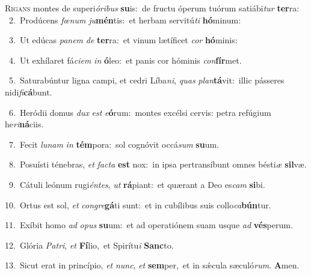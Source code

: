 \lettrine{\initial\textcolor{\initialcolor}{R}}{igans} montes de superi\-\textit{ó}\-\textit{ri}\textit{bus} \textbf{su}\-is:~\star de fructu óperum tuórum satiábi\textit{tur} \textbf{ter}\-ra:\\
{\numbfont\textcolor{\numbcolor}{~2.}}~Prodúcens \textit{fœ}\-\textit{num} \textit{ju}\-\textbf{mén}tis:~\star et herbam servitú\textit{ti} \textbf{hó}\-minum:\par
{\numbfont\textcolor{\numbcolor}{~3.}}~Ut edúcas \textit{pa}\-\textit{nem} \textit{de} \textbf{ter}\-ra:~\star et vinum lætíficet \textit{cor} \textbf{hó}\-minis:\par
{\numbfont\textcolor{\numbcolor}{~4.}}~Ut exhílaret fá\-\textit{ci}\-\textit{em} \textit{in} \textbf{ó}\-leo:~\star et panis cor hóminis \textit{con}\-\textbf{fír}met.\par
{\numbfont\textcolor{\numbcolor}{~5.}}~Saturabúntur ligna campi, et cedri Líba\-\textit{ni}\-, \textit{quas} \textit{plan}\-\textbf{tá}vit:~\star illic pásseres nidi\-\textit{fi}\-\textbf{cá}bunt.\par
{\numbfont\textcolor{\numbcolor}{~6.}}~Heródii domus \textit{dux} \textit{est} \textit{e}\-\textbf{ó}rum:~\star montes excélsi cervis: petra refúgium he\-\textit{ri}\-\textbf{ná}ciis.\par
{\numbfont\textcolor{\numbcolor}{~7.}}~Fecit \textit{lu}\-\textit{nam} \textit{in} \textbf{tém}\-pora:~\star sol cognóvit occá\textit{sum} \textbf{su}\-um.\par
{\numbfont\textcolor{\numbcolor}{~8.}}~Posuísti ténebras, \textit{et} \textit{fac}\-\textit{ta} \textbf{est} nox:~\star in ipsa pertransíbunt omnes bésti\textit{æ} \textbf{sil}\-væ.\par
{\numbfont\textcolor{\numbcolor}{~9.}}~Cátuli leónum rugi\-\textit{én}\-\textit{tes}, \textit{ut} \textbf{rá}\-piant:~\star et quærant a Deo es\textit{cam} \textbf{si}\-bi.\par
{\numbfont\textcolor{\numbcolor}{10.}}~Ortus est sol, \textit{et} \textit{con}\-\textit{gre}\textbf{gá}ti sunt:~\star et in cubílibus suis collo\-\textit{ca}\-\textbf{bún}tur.\par
{\numbfont\textcolor{\numbcolor}{11.}}~Exíbit homo \textit{ad} \textit{o}\-\textit{pus} \textbf{su}\-um:~\star et ad operatiónem suam usque \textit{ad} \textbf{vés}\-perum.\par
{\numbfont\textcolor{\numbcolor}{12.}}~Glória \textit{Pa}\-\textit{tri}, \textit{et} \textbf{Fí}\-lio,~\star et Spirítu\textit{i} \textbf{Sanc}\-to.\par
{\numbfont\textcolor{\numbcolor}{13.}}~Sicut erat in princípio, \textit{et} \textit{nunc}\-, \textit{et} \textbf{sem}\-per,~\star et in sǽcula sæculó\-\textit{rum}\-. \textbf{A}\-men.\par
